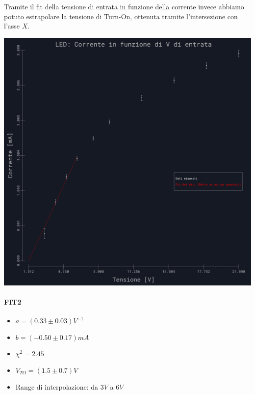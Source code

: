 \documentclass{article}
\begin{document}
Tramite il fit della tensione di entrata in funzione della corrente invece abbiamo potuto estrapolare la tensione di Turn-On, ottenuta tramite l'intersezione con l'asse $X$.

\begin{center}
    \begin{minipage}{.6\textwidth} %
        \centering
        \includegraphics[width=\linewidth]{../images/grafico8.png} %
        \label{grafico8}
    \end{minipage}
    \hfill
    \begin{minipage}{0.35\textwidth} %
        \paragraph{FIT2}
        \begin{itemize}
            \item $a=( 0.33\pm0.03 ) V^{-1}$
            \item $b=(-0.50\pm 0.17)mA $
            \item $\chi^2=2.45$
            \item $V_{TO}=(1.5\pm0.7 )V $
            \item Range di interpolazione: da $3 V$ a $6 V$
        \end{itemize}
    \end{minipage}
    \hfill %
\end{center}
\end{document}
